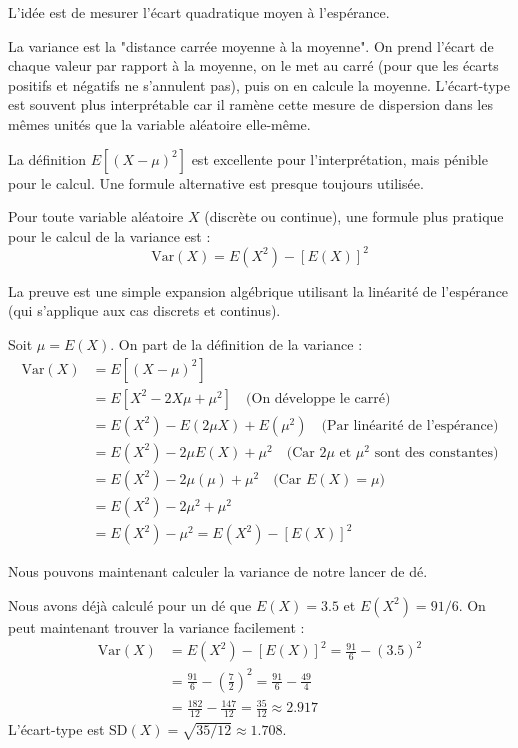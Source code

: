 L'idée est de mesurer l'écart quadratique moyen à l'espérance.

\begin{intuitionbox}
La variance est la "distance carrée moyenne à la moyenne". On prend l'écart de chaque valeur par rapport à la moyenne, on le met au carré (pour que les écarts positifs et négatifs ne s'annulent pas), puis on en calcule la moyenne. L'écart-type est souvent plus interprétable car il ramène cette mesure de dispersion dans les mêmes unités que la variable aléatoire elle-même.
\end{intuitionbox}

La définition $E[(X-\mu)^2]$ est excellente pour l'interprétation, mais pénible pour le calcul. Une formule alternative est presque toujours utilisée.

\begin{theorembox}
Pour toute variable aléatoire $X$ (discrète ou continue), une formule plus pratique pour le calcul de la variance est :
$$ \text{Var}(X) = E(X^2) - [E(X)]^2 $$
\end{theorembox}

La preuve est une simple expansion algébrique utilisant la linéarité de l'espérance (qui s'applique aux cas discrets et continus).

\begin{proofbox}
Soit $\mu = E(X)$. On part de la définition de la variance :
\begin{align*}
\text{Var}(X) &= E[ (X - \mu)^2 ] \\
&= E[ X^2 - 2X\mu + \mu^2 ] \quad \text{(On développe le carré)} \\
&= E(X^2) - E(2\mu X) + E(\mu^2) \quad \text{(Par linéarité de l'espérance)} \\
&= E(X^2) - 2\mu E(X) + \mu^2 \quad \text{(Car $2\mu$ et $\mu^2$ sont des constantes)} \\
&= E(X^2) - 2\mu(\mu) + \mu^2 \quad \text{(Car $E(X) = \mu$)} \\
&= E(X^2) - 2\mu^2 + \mu^2 \\
&= E(X^2) - \mu^2 = E(X^2) - [E(X)]^2
\end{align*}
\end{proofbox}

Nous pouvons maintenant calculer la variance de notre lancer de dé.

\begin{examplebox}
Nous avons déjà calculé pour un dé que $E(X) = 3.5$ et $E(X^2) = 91/6$. On peut maintenant trouver la variance facilement :
\begin{align*}
\text{Var}(X) &= E(X^2) - [E(X)]^2 = \frac{91}{6} - (3.5)^2 \\
&= \frac{91}{6} - \left(\frac{7}{2}\right)^2 = \frac{91}{6} - \frac{49}{4} \\
&= \frac{182}{12} - \frac{147}{12} = \frac{35}{12} \approx 2.917
\end{align*}
L'écart-type est $\text{SD}(X) = \sqrt{35/12} \approx 1.708$.
\end{examplebox}

